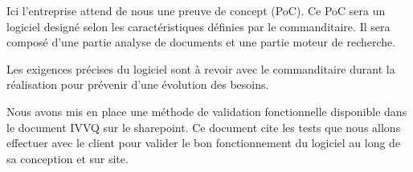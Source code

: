 
Ici l'entreprise attend de nous une preuve de concept (PoC).
Ce PoC sera un logiciel designé selon les caractéristiques définies par le commanditaire.
Il sera composé d'une partie analyse de documents et une partie moteur de recherche.

Les exigences précises du logiciel sont à revoir avec le commanditaire durant la réalisation pour prévenir d'une évolution des besoins.

Nous avons mis en place une méthode de validation fonctionnelle disponible dans le document IVVQ sur le sharepoint.
Ce document cite les tests que nous allons effectuer avec le client pour valider le bon fonctionnement du logiciel au long de sa conception et sur site.


